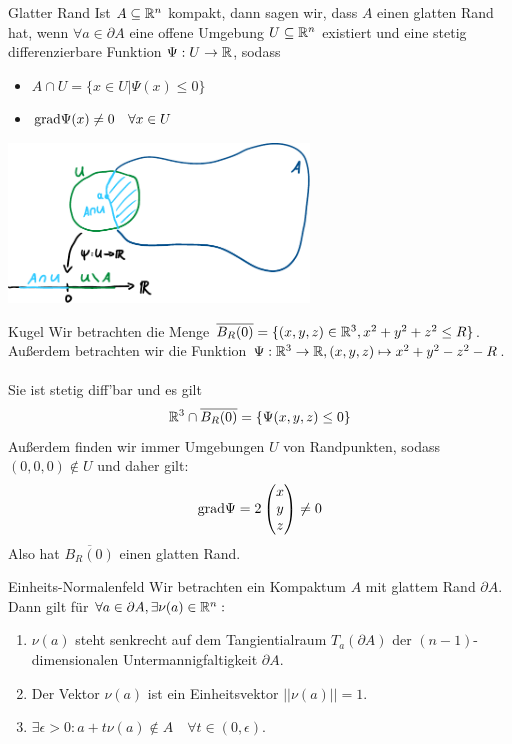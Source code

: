 \begin{Def}{Glatter Rand}
    Ist $A\subseteq \mathbb{R}^n$ kompakt, dann sagen wir, dass $A$ einen glatten Rand hat, wenn $\forall a\in \partial A$  eine offene Umgebung $U\subseteq \mathbb{R}^n$ existiert und eine stetig differenzierbare Funktion $\Psi: U\rightarrow \mathbb{R}$, sodass 
    \begin{itemize}
        \item $A\cap U = \{x\in U | \Psi(x)\leq 0\}$
        \item $\text{grad} \Psi(x) \neq 0 \quad \forall x \in U$
    \end{itemize}
       \begin{center}
    \includegraphics[width=0.6\textwidth]{Dateien/Glatter_Rand.pdf}
\end{center}
\end{Def}
\begin{Beispiel}{Kugel}
    Wir betrachten die Menge $\overline{B_R(0)}=\{(x,y,z)\in\mathbb{R}^3, x^2+y^2+z^2\leq R\}$. Außerdem betrachten wir die Funktion $\Psi: \mathbb{R}^3\rightarrow \mathbb{R}, (x,y,z)\mapsto x^2+y^2-z^2-R$. \\ \\
    Sie ist stetig diff'bar und es gilt $$\mathbb{R}^3\cap \overline{B_R(0)}=\{\Psi(x,y,z)\leq 0\}$$
    Außerdem finden wir immer Umgebungen $U$ von Randpunkten, sodass $(0,0,0)\notin U$ und daher gilt:
    $$\text{grad} \Psi=2\begin{pmatrix}
        x \\ y \\ z
    \end{pmatrix}\neq 0$$
    Also hat $\overline{B_R(0)}$ einen glatten Rand.
\end{Beispiel}
\begin{Def}{Einheits-Normalenfeld}
    Wir betrachten ein Kompaktum $A$ mit glattem Rand $\partial A$. Dann gilt für $\forall a \in \partial A, \exists\nu(a)\in \mathbb{R}^n:$
    \begin{enumerate}
        \item $\nu(a)$ steht senkrecht auf dem Tangientialraum $T_a(\partial A)$ der $(n-1)$-dimensionalen Untermannigfaltigkeit $\partial A$.
        \item Der Vektor $\nu(a)$ ist ein Einheitsvektor $||\nu(a)||=1$.
        \item $\exists \epsilon >0: a+t\nu(a)\notin A \quad \forall t\in (0,\epsilon)$.
    \end{enumerate}
\end{Def}
\newpage
